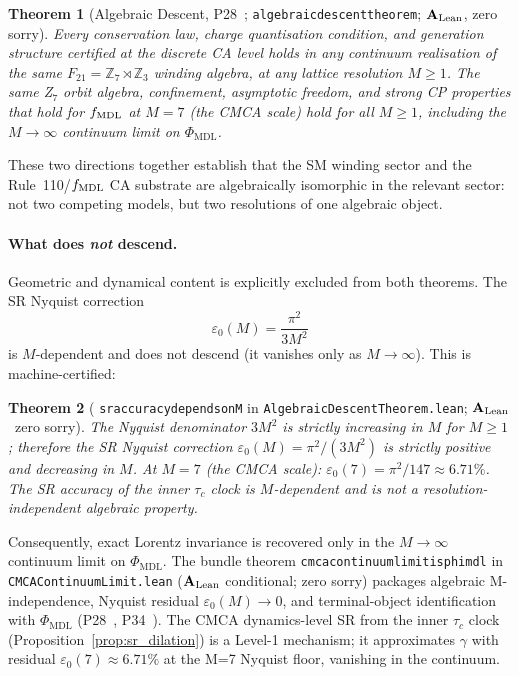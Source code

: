 \documentclass[11pt]{article}
\newtheorem{theorem}{Theorem}[section]
\theoremstyle{remark}
\newcommand{\PHIMDL}{\Phi_{\mathrm{MDL}}}
\newcommand{\ZS}{\mathbb{Z}_7}
\newcommand{\lean}[1]{%
  \penalty-100
  \begingroup\def\_{\textunderscore\allowbreak}\texttt{#1}\endgroup}
\newcommand{\epsz}{\varepsilon_0}
\newcommand{\CatAL}{\ensuremath{\textbf{A}_{\rm Lean}}}
\begin{document}
\begin{theorem}[Algebraic Descent, P28~\cite{SpivackCompUniversality};
  \lean{algebraic\_descent\_theorem}; \CatAL, zero sorry]
\label{thm:descent}
Every conservation law, charge quantisation condition, and generation structure
certified at the discrete CA level holds in any continuum realisation of the
same $F_{21} = \ZS\rtimes\mathbb{Z}_3$\allowbreak{} winding algebra,
at any lattice resolution $M\geq1$.
The same Z$_7$ orbit algebra, confinement, asymptotic freedom, and strong CP
properties that hold for $f_{\rm MDL}$ at $M=7$ (the CMCA scale) hold for all
$M\geq1$, including the $M\to\infty$ continuum limit on $\PHIMDL$.
\end{theorem}

These two directions together establish that the SM winding sector and the
Rule~110/$f_{\rm MDL}$ CA substrate are algebraically isomorphic in the
relevant sector: not two competing models, but two resolutions of one algebraic
object.

\paragraph{What does \emph{not} descend.}
Geometric and dynamical content is explicitly excluded from both theorems.
The SR Nyquist correction
\begin{equation}
  \epsz(M) = \frac{\pi^2}{3M^2}
\end{equation}
is $M$-dependent and does not descend (it vanishes only as $M\to\infty$).
This is machine-certified:

\begin{theorem}[\lean{sr\_accuracy\_depends\_on\_M} in \lean{AlgebraicDescentTheorem.lean};
  \CatAL\ zero sorry]
\label{thm:sr_accuracy_m}
The Nyquist denominator $3M^2$ is strictly increasing in $M$ for $M\geq1$;
therefore the SR Nyquist correction $\epsz(M) = \pi^2/(3M^2)$ is strictly
positive and decreasing in $M$.
At $M=7$ (the CMCA scale): $\epsz(7) = \pi^2/147 \approx 6.71\%$.
The SR accuracy of the inner $\tau_c$ clock is $M$-dependent and is
\emph{not} a resolution-independent algebraic property.
\end{theorem}

Consequently, exact Lorentz invariance is recovered only in the $M\to\infty$
continuum limit on $\PHIMDL$.  The bundle theorem
\lean{cmca\_continuum\_limit\_is\_phimdl} in \lean{CMCAContinuumLimit.lean}
(\CatAL{} conditional; zero sorry) packages algebraic M-independence,
Nyquist residual $\epsz(M)\to0$, and terminal-object identification with
$\PHIMDL$ (P28~\cite{SpivackCompUniversality}, P34~\cite{SpivackGTEMobius}).
The CMCA dynamics-level SR
from the inner $\tau_c$ clock (Proposition~\ref{prop:sr_dilation}) is a
Level-1 mechanism; it approximates $\gamma$ with residual $\epsz(7)\approx6.71\%$
at the M=7 Nyquist floor, vanishing in the continuum.
\end{document}
